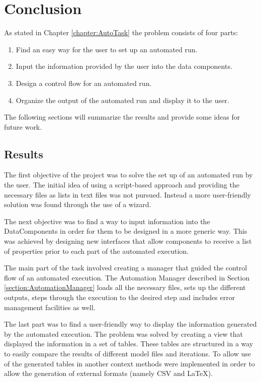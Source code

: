 \chapter{Conclusion}
\label{chapter:AutoConclusion}
As stated in Chapter \ref{chapter:AutoTask} the problem consists of four parts:
\begin{enumerate}
 \item Find an easy way for the user to set up an automated run.
 \item Input the information provided by the user into the data components.
 \item Design a control flow for an automated run.
 \item Organize the output of the automated run and display it to the user.
\end{enumerate}
The following sections will summarize the results and provide some ideas for
future work.

\section{Results}
\label{section:AutoResults}
The first objective of the project was to solve the set up of an automated run
by the user. The initial idea of using a script-based approach and providing the
necessary files as lists in text files was not pursued. Instead a more user-friendly
solution was found through the use of a wizard. 

The next objective was to find a way to input information into the DataComponents
in order for them to be designed in a more generic way. This was achieved by
designing new interfaces that allow components to receive a list of properties
prior to each part of the automated execution.

The main part of the task involved creating a manager that guided the control flow
of an automated execution. The Automation Manager described in Section \ref{section:AutomationManager}
loads all the necessary files, sets up the different outputs, steps through the
execution to the desired step and includes error management facilities as well.

The last part was to find a user-friendly way to display the information generated
by the automated execution. The problem was solved by creating a view that displayed
the information in a set of tables. These tables are structured in a way to easily
compare the results of different model files and iterations. To allow use of the 
generated tables in another context methods were implemented in order to allow
the generation of external formats (namely \ac{CSV} and \LaTeX).


